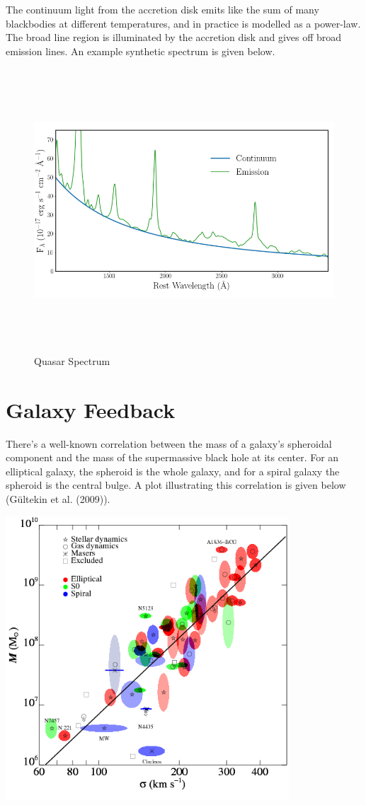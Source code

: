 \documentclass[]{article}
\begin{document}
The continuum light from the accretion disk emits like the sum of many
blackbodies at different temperatures, and in practice is modelled as a
power-law. The broad line region is illuminated by the accretion disk
and gives off broad emission lines. An example synthetic spectrum is
given below.

\begin{figure}
\centering
\includegraphics[width=\textwidth,height=4.16667in]{./Emission_Spectrum.png}
\caption{Quasar Spectrum}
\end{figure}

\hypertarget{galaxy-feedback}{%
\section{Galaxy Feedback}\label{galaxy-feedback}}

There's a well-known correlation between the mass of a galaxy's
spheroidal component and the mass of the supermassive black hole at its
center. For an elliptical galaxy, the spheroid is the whole galaxy, and
for a spiral galaxy the spheroid is the central bulge. A plot
illustrating this correlation is given below (Gültekin et al. (2009)).

\includegraphics[width=\textwidth,height=4.16667in]{./msigma.png}
\end{document}
